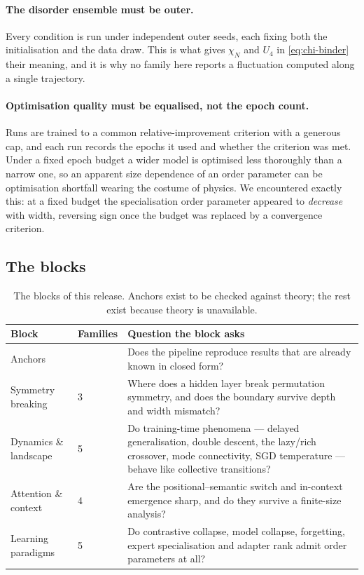 \paragraph{The disorder ensemble must be outer.}
Every condition is run under \AtlasSpecializationSeeds{} independent outer
seeds, each fixing both the initialisation and the data draw. This is what
gives $\chi_N$ and $U_4$ in \eqref{eq:chi-binder} their meaning, and it is why
no family here reports a fluctuation computed along a single trajectory.

\paragraph{Optimisation quality must be equalised, not the epoch count.}
Runs are trained to a common relative-improvement criterion with a generous
cap, and each run records the epochs it used and whether the criterion was
met. Under a fixed epoch budget a wider model is optimised less thoroughly than
a narrow one, so an apparent size dependence of an order parameter can be
optimisation shortfall wearing the costume of physics. We encountered exactly
this: at a fixed budget the specialisation order parameter appeared to
\emph{decrease} with width, reversing sign once the budget was replaced by a
convergence criterion.

\subsection{The blocks}

\begin{table}[tbp]
\centering\small
\begin{tabularx}{\linewidth}{@{}p{26mm}p{16mm}Y@{}}
\toprule
Block & Families & Question the block asks \\
\midrule
Anchors & \AtlasAnchorFamilies{} & Does the pipeline reproduce results that are
already known in closed form? \\
Symmetry breaking & 3 & Where does a hidden layer break permutation symmetry,
and does the boundary survive depth and width mismatch? \\
Dynamics \& landscape & 5 & Do training-time phenomena --- delayed
generalisation, double descent, the lazy/rich crossover, mode connectivity,
SGD temperature --- behave like collective transitions? \\
Attention \& context & 4 & Are the positional--semantic switch and in-context
emergence sharp, and do they survive a finite-size analysis? \\
Learning paradigms & 5 & Do contrastive collapse, model collapse, forgetting,
expert specialisation and adapter rank admit order parameters at all? \\
\bottomrule
\end{tabularx}
\caption{The blocks of this release. Anchors exist to be checked against
theory; the rest exist because theory is unavailable.}
\label{tab:blocks}
\end{table}



